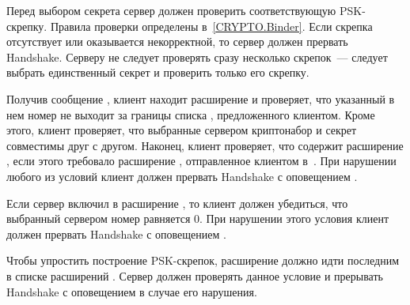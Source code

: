 Перед выбором секрета сервер должен проверить соответствующую PSK-скрепку.
Правила проверки определены в~\ref{CRYPTO.Binder}. Если скрепка отсутствует или 
оказывается некорректной, то сервер должен прервать Handshake. Серверу не следует 
проверять сразу несколько скрепок~--- следует выбрать единственный секрет и 
проверить только его скрепку.


Получив сообщение , клиент находит расширение 
 и проверяет, что указанный в нем номер 
 не выходит за границы списка 
, предложенного клиентом.
%
Кроме этого, клиент проверяет, что выбранные сервером криптонабор и секрет 
совместимы друг с другом.
%
Наконец, клиент проверяет, что  содержит 
расширение , если этого требовало расширение 
, отправленное клиентом 
в~.
%
При нарушении любого из условий клиент должен прервать Handshake с оповещением
.

Если сервер включил в  расширение
, то клиент должен убедиться, что выбранный 
сервером номер  равняется 0. При нарушении этого 
условия клиент должен прервать Handshake с оповещением 
.

Чтобы упростить построение PSK-скрепок, расширение  должно 
идти последним в списке расширений . Сервер должен 
проверять данное условие и прерывать Handshake с оповещением 
 в случае его нарушения.


